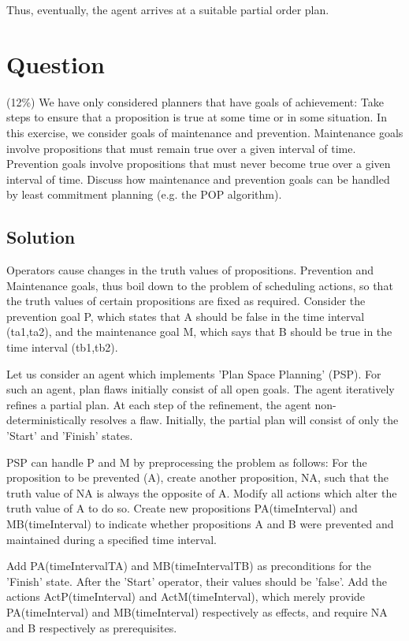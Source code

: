 \documentclass[10pt]{article}
\begin{document}
Thus, eventually, the agent arrives at a suitable partial order plan.

\section{Question} 
 (12\%) We have only considered planners that have goals of achievement: Take steps to ensure that a proposition is true at some time or in some situation. In this exercise, we consider goals of maintenance and prevention. Maintenance goals involve propositions that must remain true over a given interval of time. Prevention goals involve propositions that must never become true over a given interval of time. Discuss how maintenance and prevention goals can be handled by least commitment planning (e.g. the POP algorithm).

\subsection{Solution}

Operators cause changes in the truth values of propositions. Prevention and Maintenance goals, thus boil down to the problem of scheduling actions, so that the truth values of certain propositions are fixed as required. Consider the prevention goal P, which states that A should be false in the time interval (ta1,ta2), and the maintenance goal M, which says that B should be true in the time interval (tb1,tb2).

Let us consider an agent which implements 'Plan Space Planning' (PSP). For such an agent, plan flaws initially consist of all open goals. The agent iteratively refines a partial plan. At each step of the refinement, the agent non-deterministically resolves a flaw. Initially, the partial plan will consist of only the 'Start' and 'Finish' states.

PSP can handle P and M by preprocessing the problem as follows: For the proposition to be prevented (A), create another proposition, NA, such that the truth value of NA is always the opposite of A. Modify all actions which alter the truth value of A to do so. Create new propositions PA(timeInterval) and MB(timeInterval) to indicate whether propositions A and B were prevented and maintained during a specified time interval.

Add PA(timeIntervalTA) and MB(timeIntervalTB) as preconditions for the 'Finish' state. After the 'Start' operator, their values should be 'false'. Add the actions ActP(timeInterval) and ActM(timeInterval), which merely provide PA(timeInterval) and MB(timeInterval) respectively as effects, and require NA and B respectively as prerequisites.
\end{document}

